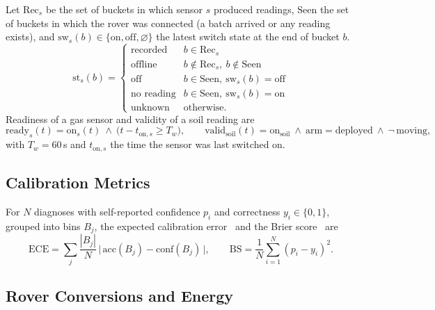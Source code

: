 Let $\mathrm{Rec}_s$ be the set of buckets in which sensor $s$ produced readings, $\mathrm{Seen}$ the set of buckets in which the rover was
connected (a batch arrived or any reading exists), and $\mathrm{sw}_s(b)\in\{\mathrm{on},\mathrm{off},\varnothing\}$ the latest switch state at the end of bucket $b$.
\begin{equation}
\mathrm{st}_s(b)=
\begin{cases}
\text{recorded} & b\in \mathrm{Rec}_s\\
\text{offline} & b\notin \mathrm{Rec}_s,\ b\notin \mathrm{Seen}\\
\text{off} & b\in \mathrm{Seen},\ \mathrm{sw}_s(b)=\mathrm{off}\\
\text{no reading} & b\in \mathrm{Seen},\ \mathrm{sw}_s(b)=\mathrm{on}\\
\text{unknown} & \text{otherwise.}
\end{cases}
\label{eq:status}
\end{equation}
Readiness of a gas sensor and validity of a soil reading are
\begin{equation}
\mathrm{ready}_s(t)=\mathrm{on}_s(t)\ \wedge\ \bigl(t-t_{\mathrm{on},s}\ge T_w\bigr),\qquad
\mathrm{valid}_{\mathrm{soil}}(t)=\mathrm{on}_{\mathrm{soil}}\ \wedge\ \mathrm{arm}=\text{deployed}\ \wedge\ \neg\,\mathrm{moving},
\label{eq:ready}
\end{equation}
with $T_w=60$\,s and $t_{\mathrm{on},s}$ the time the sensor was last switched on.

\subsection{Calibration Metrics}

For $N$ diagnoses with self-reported confidence $p_i$ and correctness $y_i\in\{0,1\}$, grouped into bins $B_j$, the expected calibration
error~\cite{guo2017calibration} and the Brier score~\cite{brier1950verification} are
\begin{equation}
\mathrm{ECE}=\sum_{j}\frac{|B_j|}{N}\,\bigl|\,\mathrm{acc}(B_j)-\mathrm{conf}(B_j)\,\bigr|,\qquad
\mathrm{BS}=\frac{1}{N}\sum_{i=1}^{N}(p_i-y_i)^2.
\label{eq:calibration}
\end{equation}

\subsection{Rover Conversions and Energy}

